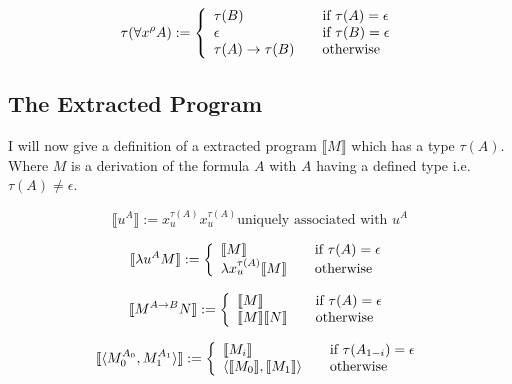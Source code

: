 \[
\tau(\forall x^{\rho} A) := \left\{ 
\begin{array}{l l}
  \tau (B) & \quad \text{if $\tau (A) = \epsilon$}\\
  \epsilon & \quad \text{if $\tau (B) = \epsilon$}\\
  \tau (A) \to \tau (B) & \quad \text{otherwise}\\
\end{array} \right.
\]

\subsection*{The Extracted Program}
I will now give a definition of a extracted program $\llbracket M \rrbracket$
which has a type $\tau (A)$. Where $M$ is a derivation of the formula $A$ with
$A$ having a defined type i.e. $ \tau (A) \neq \epsilon $.

\[ \llbracket u^A \rrbracket := x^{\tau (A)}_{u} \text{$x^{\tau (A)}_u$
  uniquely associated with $u^A$}
\]

\[
\llbracket \lambda u^A M \rrbracket := \left\{ 
\begin{array}{l l}
\llbracket M \rrbracket  & \quad \text{if $\tau (A) = \epsilon$} \\ 
\lambda x^{\tau (A)}_{u} \llbracket M \rrbracket & \quad \text{otherwise} \\

\end{array} \right.
 \]

\[
\llbracket M^{A \to B} N \rrbracket := \left\{ 
\begin{array}{l l}
\llbracket M \rrbracket  & \quad \text{if $\tau (A) = \epsilon$} \\ 
\llbracket M \rrbracket  \llbracket N \rrbracket & \quad \text{otherwise} \\

\end{array} \right.
 \]

\[
\llbracket \langle M^{A_0}_0, M^{A_1}_1 \rangle \rrbracket := \left\{ 
\begin{array}{l l}
\llbracket M_i \rrbracket  & \quad \text{if $\tau (A_{1-i}) = \epsilon$} \\ 
\langle \llbracket M_0 \rrbracket , \llbracket M_1 \rrbracket \rangle & \quad \text{otherwise} \\

\end{array} \right.
 \]




